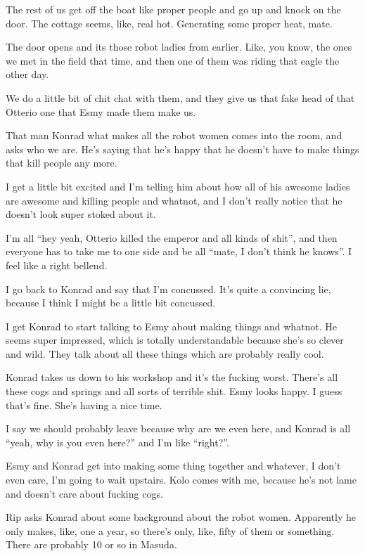 The rest of us get off the boat like proper people and go up and knock on the door. The cottage seems, like, real hot. Generating some proper heat, mate.\medskip

The door opens and its those robot ladies from earlier. Like, you know, the ones we met in the field that time, and then one of them was riding that eagle the other day.\medskip

We do a little bit of chit chat with them, and they give us that fake head of that Otterio one that Esmy made them make us.\medskip

That man Konrad what makes all the robot women comes into the room, and asks who we are. He's saying that he's happy that he doesn't have to make things that kill people any more.\medskip

I get a little bit excited and I'm telling him about how all of his awesome ladies are awesome and killing people and whatnot, and I don't really notice that he doesn't look super stoked about it.\medskip

I'm all ``hey yeah, Otterio killed the emperor and all kinds of shit'', and then everyone has to take me to one side and be all ``mate, I don't think he knows''. I feel like a right bellend.\medskip

I go back to Konrad and say that I'm concussed. It's quite a convincing lie, because I think I might be a little bit concussed.\medskip

I get Konrad to start talking to Esmy about making things and whatnot. He seems super impressed, which is totally understandable because she's so clever and wild. They talk about all these things which are probably really cool.\medskip

Konrad takes us down to his workshop and it's the fucking worst. There's all these cogs and springs and all sorts of terrible shit. Esmy looks happy. I guess that's fine. She's having a nice time.\medskip

I say we should probably leave because why are we even here, and Konrad is all ``yeah, why is you even here?'' and I'm like ``right?''.\medskip

Esmy and Konrad get into making some thing together and whatever, I don't even care, I'm going to wait upstairs. Kolo comes with me, because he's not lame and doesn't care about fucking cogs.\medskip

Rip asks Konrad about some background about the robot women. Apparently he only makes, like, one a year, so there's only, like, fifty of them or something. There are probably 10 or so in Masuda.\medskip

